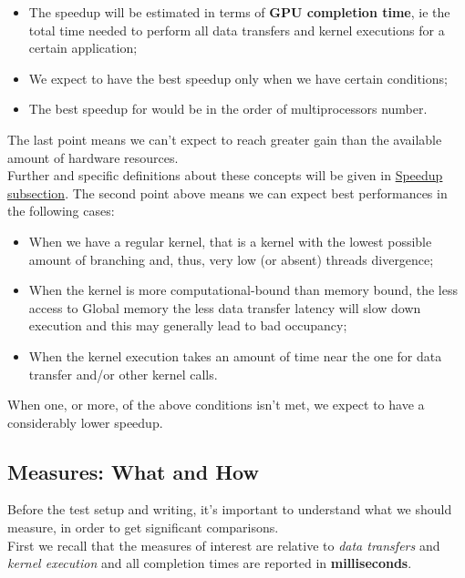 \begin{itemize}
	\item The speedup will be estimated in terms of \textbf{GPU completion time}, ie the total time needed to perform all data transfers and kernel executions for a certain application;
	\item We expect to have the best speedup only when we have certain conditions;
	\item The best speedup for would be in the order of multiprocessors number.
\end{itemize}
The last point means we can't expect to reach greater gain than the available amount of hardware resources.\\
Further and specific definitions about these concepts will be given in \hyperref[subs:speedup]{Speedup subsection}.
The second point above means we can expect best performances in the following cases:
\begin{itemize}
	\item When we have a regular kernel, that is a kernel with the lowest possible amount of branching and, thus, very low (or absent) threads divergence;
	\item When the kernel is more computational-bound than memory bound, the less access to Global memory the less data transfer latency will slow down execution and this may generally lead to bad occupancy;
	\item When the kernel execution takes an amount of time near the one for data transfer and/or other kernel calls.
\end{itemize} 
When one, or more, of the above conditions isn't met, we expect to have a considerably lower speedup.


\subsection{Measures: What and How}
Before the test setup and writing, it's important to understand what we should measure, in order to get significant comparisons.\\
First we recall that the measures of interest are relative to \textit{data transfers} and \textit{kernel execution} and all completion times are reported in \textbf{milliseconds}. 

